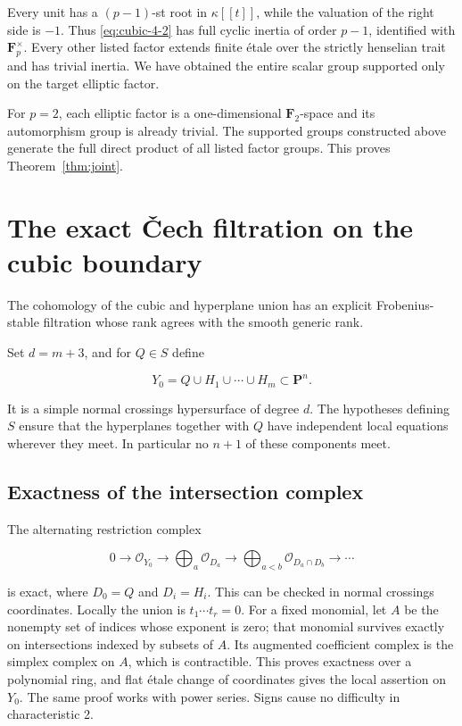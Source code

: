\documentclass[11pt]{article}
\begin{document}
Every unit has a \((p-1)\)-st root in \(\kappa[[t]]\), while the valuation of the right side is \(-1\). Thus \eqref{eq:cubic-4-2} has full cyclic inertia of order \(p-1\), identified with \(\mathbf F_p^\times\). Every other listed factor extends finite étale over the strictly henselian trait and has trivial inertia. We have obtained the entire scalar group supported only on the target elliptic factor.

For \(p=2\), each elliptic factor is a one-dimensional \(\mathbf F_2\)-space and its automorphism group is already trivial. The supported groups constructed above generate the full direct product of all listed factor groups. This proves Theorem~\ref{thm:joint}.

\section{The exact \v Cech filtration on the cubic boundary}\label{sec:cubic-cech}
The cohomology of the cubic and hyperplane union has an explicit Frobenius-stable filtration whose rank agrees with the smooth generic rank.


Set \(d=m+3\), and for \(Q\in S\) define

\begin{equation}
Y_0=Q\cup H_1\cup\cdots\cup H_m\subset\mathbf P^n.
\label{eq:cubic-5-1}
\end{equation}

It is a simple normal crossings hypersurface of degree \(d\). The hypotheses defining \(S\) ensure that the hyperplanes together with \(Q\) have independent local equations wherever they meet. In particular no \(n+1\) of these components meet.

\subsection{Exactness of the intersection complex}\label{sec:cubic-cech-resolution}

The alternating restriction complex

\begin{equation}
0\longrightarrow\mathcal O_{Y_0}\longrightarrow
\bigoplus_a\mathcal O_{D_a}\longrightarrow
\bigoplus_{a<b}\mathcal O_{D_a\cap D_b}\longrightarrow\cdots
\label{eq:cubic-5-2}
\end{equation}

is exact, where \(D_0=Q\) and \(D_i=H_i\). This can be checked in normal crossings coordinates. Locally the union is \(t_1\cdots t_r=0\). For a fixed monomial, let \(A\) be the nonempty set of indices whose exponent is zero; that monomial survives exactly on intersections indexed by subsets of \(A\). Its augmented coefficient complex is the simplex complex on \(A\), which is contractible. This proves exactness over a polynomial ring, and flat étale change of coordinates gives the local assertion on \(Y_0\). The same proof works with power series. Signs cause no difficulty in characteristic 2.
\end{document}

